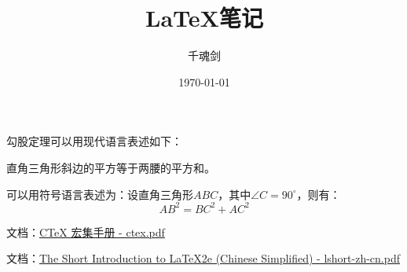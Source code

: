 \documentclass{article}
\title{\heiti LaTeX笔记}  %
\author{\kaishu 千魂剑}
\date{\today}
\newcommand\degree{^\circ}
\begin{document}
    \maketitle
    勾股定理可以用现代语言表述如下：

    直角三角形斜边的平方等于两腰的平方和。

    可以用符号语言表述为：设直角三角形$ABC$，其中$\angle C=90\degree$，则有：
    \begin{equation}  %
        AB^2 = BC^2 + AC^2
    \end{equation}
    
    \CTeX 文档：\href{https://texdoc.net/texmf-dist/doc/latex/ctex/ctex.pdf}{CTeX 宏集手册 - ctex.pdf}
    
    \LaTeXe 文档：\href{https://texdoc.net/texmf-dist/doc/latex/lshort-chinese/lshort-zh-cn.pdf}{The Short Introduction to LaTeX2e (Chinese Simplified) - lshort-zh-cn.pdf}
\end{document}
